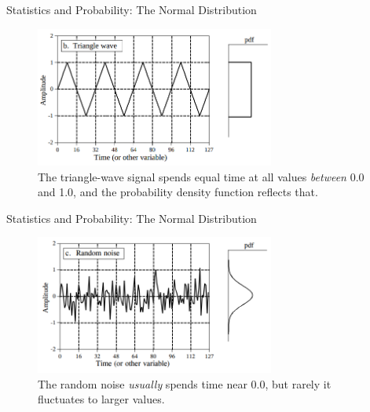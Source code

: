 \documentclass{beamer}
\begin{document}
\begin{frame}[fragile]{Statistics and Probability: The Normal Distribution}
\begin{figure}
\centering
\includegraphics[width=0.7\textwidth]{figures/trianglepdf.png}
\caption{\label{fig:trianglepdf} The triangle-wave signal spends equal time at all values \textit{between} 0.0 and 1.0, and the probability density function reflects that.}
\end{figure}
\end{frame}

\begin{frame}[fragile]{Statistics and Probability: The Normal Distribution}
\begin{figure}
\centering
\includegraphics[width=0.7\textwidth]{figures/randnpdf.png}
\caption{\label{fig:randnpdf} The random noise \textit{usually} spends time near 0.0, but rarely it fluctuates to larger values.}
\end{figure}
\end{frame}
\end{document}
